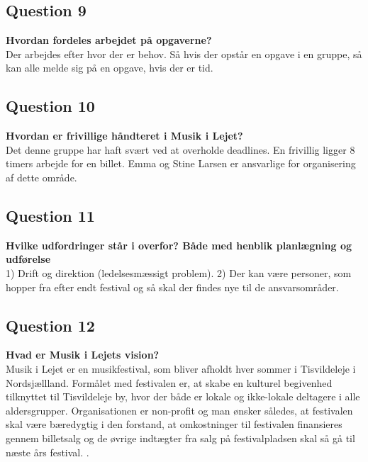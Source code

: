 \subsection{Question 9}
\label{i1q9}
\noindent \textbf{Hvordan fordeles arbejdet på opgaverne?} \\
Der arbejdes efter hvor der er behov. Så hvis der opstår en opgave i en gruppe, så kan alle melde sig på en opgave, hvis der er tid. 


\subsection{Question 10}
\label{i1q10}
\noindent \textbf{Hvordan er frivillige håndteret i Musik i Lejet?} \\
Det denne gruppe har haft svært ved at overholde deadlines. En frivillig ligger 8 timers arbejde for en billet. Emma og Stine Larsen er ansvarlige for organisering af dette område.


\subsection{Question 11}
\label{i1q11}
\noindent \textbf{Hvilke udfordringer står i overfor? Både med henblik planlægning og udførelse} \\
1) Drift og direktion (ledelsesmæssigt problem). 
2) Der kan være personer, som hopper fra efter endt festival og så skal der findes nye til de ansvarsområder.


\subsection{Question 12}
\label{i1q12}
\noindent \textbf{Hvad er Musik i Lejets vision?} \\
Musik i Lejet er en musikfestival, som bliver afholdt hver sommer i Tisvildeleje i Nordsjællland. Formålet med festivalen er, at skabe en kulturel begivenhed tilknyttet til Tisvildeleje by, hvor der både er lokale og ikke-lokale deltagere i alle aldersgrupper. Organisationen er non-profit og man ønsker således, at festivalen skal være bæredygtig i den forstand, at omkostninger til festivalen finansieres gennem billetsalg og de øvrige indtægter fra salg på festivalpladsen skal så gå til næste års festival. . 
